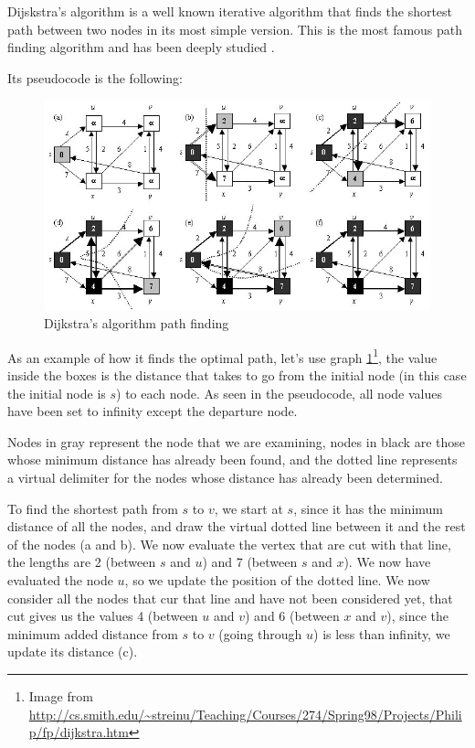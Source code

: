 
Dijskstra's algorithm is a well known iterative algorithm that finds the shortest path between two nodes in its most simple version. This is the most famous path finding algorithm and has been deeply studied \cite{dijkstra_1} \cite{dijkstra_2}.

Its pseudocode is the following:

\begin{figure}[!ht]
  \centering
  \includegraphics[scale=0.5]{images/dijkstra.jpg} 
  \caption{Dijkstra's algorithm path finding}
  \label{dijkstra}
\end{figure}

As an example of how it finds the optimal path, let's use graph \ref{dijkstra}\footnote{Image from \url{http://cs.smith.edu/~streinu/Teaching/Courses/274/Spring98/Projects/Philip/fp/dijkstra.htm}}, the value inside the boxes is the distance that takes to go from the initial node (in this case the initial node is $s$) to each node. As seen in the pseudocode, all node values have been set to infinity except the departure node.

Nodes in gray represent the node that we are examining, nodes in black are those whose minimum distance has already been found, and the dotted line represents a virtual delimiter for the nodes whose distance has already been determined.

To find the shortest path from $s$ to $v$, we start at $s$, since it has the minimum distance of all the nodes, and draw the virtual dotted line between it and the rest of the nodes (a and b). We now evaluate the vertex that are cut with that line, the lengths are 2 (between $s$ and $u$) and 7 (between $s$ and $x$). We now have evaluated the node $u$, so we update the position of the dotted line. We now consider all the nodes that cur that line and have not been considered yet, that cut gives us the values 4 (between $u$ and $v$) and 6 (between $x$ and $v$), since the minimum added distance from $s$ to $v$ (going through $u$) is less than infinity, we update its distance (c).

